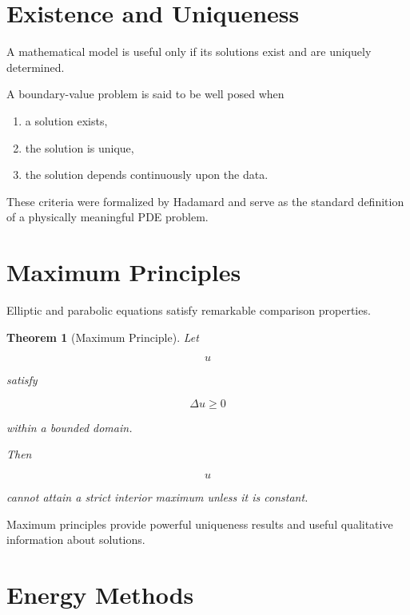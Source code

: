\documentclass[11pt,fleqn]{book}
\numberwithin{equation}{chapter}
\theoremstyle{plain}
\newtheorem{theorem}{Theorem}[chapter]
\theoremstyle{definition}
\theoremstyle{remark}
\begin{document}

\section{Existence and Uniqueness}

A mathematical model is useful only if its solutions exist and are
uniquely determined.

A boundary-value problem is said to be well posed when

\begin{enumerate}
\item a solution exists,
\item the solution is unique,
\item the solution depends continuously upon the data.
\end{enumerate}

These criteria were formalized by Hadamard and serve as the standard
definition of a physically meaningful PDE problem.


\section{Maximum Principles}

Elliptic and parabolic equations satisfy remarkable comparison
properties.

\begin{theorem}[Maximum Principle]

Let

\[
u
\]

satisfy

\[
\Delta u
\ge0
\]

within a bounded domain.

Then

\[
u
\]

cannot attain a strict interior maximum unless it is constant.

\end{theorem}

Maximum principles provide powerful uniqueness results and useful
qualitative information about solutions.


\section{Energy Methods}
\end{document}
